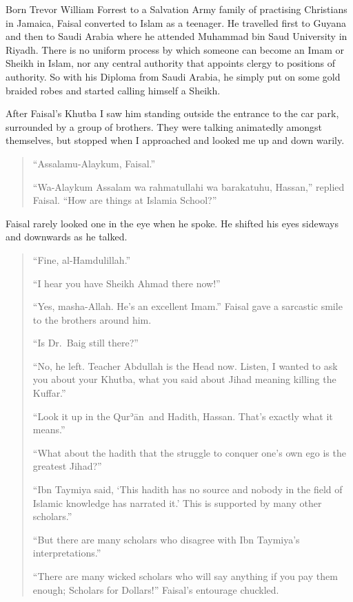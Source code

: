 \documentclass[12pt]{memoir}
\def\´{ʾ} %
\newcommand{\cor}[2]{#2} %
\def \Quran{Qur\-\´ān} %
\begin{document}
Born Trevor William Forrest to a Salvation Army family
of practising Christians in Jamaica,
Faisal converted to Islam as a teenager.
He travelled first to Guyana and then to Saudi Arabia
where he attended Muhammad bin Saud University in Riyadh.
There is no uniform process by which someone
can become an Imam or Sheikh in Islam,
nor any central authority that appoints clergy to positions of authority.
So with his Diploma from Saudi Arabia,
he simply put on some gold braided robes
and started calling himself a Sheikh.

After Faisal’s Khutba I saw him standing outside the entrance to the car park,
surrounded by a group of brothers.
They were talking animatedly amongst themselves,
but stopped when I approached and looked me up and down warily.

\begin{quote}
“Assalamu-Alaykum, Faisal.”

“Wa-Alaykum Assalam wa rahmatullahi wa barakatuhu, Hassan,” replied Faisal.
“How are things at Islamia School?”
\end{quote}

Faisal rarely looked one in the eye when he spoke.
He shifted his eyes sideways and downwards as he talked.

\begin{quote}
“Fine, al-\cor{Hamdulilah}{Hamdulillah}.”

“I hear you have Sheikh Ahmad there now!”

“Yes, masha-Allah.
He’s an excellent Imam.”
Faisal gave a sarcastic smile to the brothers around him.

“Is Dr.\ Baig still there?”

“No, he left.
Teacher Abdullah is the Head now.
Listen, I wanted to ask you about your Khutba,
what you said about Jihad meaning killing the Kuffar.”

“Look it up in the \Quran\ and Hadith, Hassan.
That’s exactly what it means.”

“What about the hadith that the struggle to conquer one’s own ego
is the greatest Jihad?”

“Ibn \cor{Taymia}{Taymiya} said,
‘This hadith has no source and nobody in the field of Islamic knowledge
has narrated it.’
This is supported by many other scholars.”

“But there are many scholars who disagree
with Ibn \cor{Taymia}{Taymiya}’s interpretations.”

“There are many wicked scholars who will say anything if you pay them enough;
Scholars for Dollars!”
Faisal’s entourage chuckled.
\end{quote}
\end{document}
